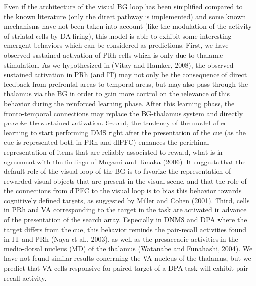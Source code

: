 \documentclass[
  11pt,
  a4paper,
]{scrbook}
\begin{document}
Even if the architecture of the visual BG loop has been simplified
compared to the known literature (only the direct pathway is
implemented) and some known mechanisms have not been taken into account
(like the modulation of the activity of striatal cells by DA firing),
this model is able to exhibit some interesting emergent behaviors which
can be considered as predictions. First, we have observed sustained
activation of PRh cells which is only due to thalamic stimulation. As we
hypothesized in (Vitay and Hamker, 2008), the observed sustained
activation in PRh (and IT) may not only be the consequence of direct
feedback from prefrontal areas to temporal areas, but may also pass
through the thalamus via the BG in order to gain more control on the
relevance of this behavior during the reinforced learning phase. After
this learning phase, the fronto-temporal connections may replace the
BG-thalamus system and directly provoke the sustained activation.
Second, the tendency of the model after learning to start performing DMS
right after the presentation of the cue (as the cue is represented both
in PRh and dlPFC) enhances the perirhinal representation of items that
are reliably associated to reward, what is in agreement with the
findings of Mogami and Tanaka (2006). It suggests that the default role
of the visual loop of the BG is to favorize the representation of
rewarded visual objects that are present in the visual scene, and that
the role of the connections from dlPFC to the visual loop is to bias
this behavior towards cognitively defined targets, as suggested by
Miller and Cohen (2001). Third, cells in PRh and VA corresponding to the
target in the task are activated in advance of the presentation of the
search array. Especially in DNMS and DPA where the target differs from
the cue, this behavior reminds the pair-recall activities found in IT
and PRh (Naya et al., 2003), as well as the presaccadic activities in
the medio-dorsal nucleus (MD) of the thalamus (Watanabe and Funahashi,
2004). We have not found similar results concerning the VA nucleus of
the thalamus, but we predict that VA cells responsive for paired target
of a DPA task will exhibit pair-recall activity.
\end{document}
